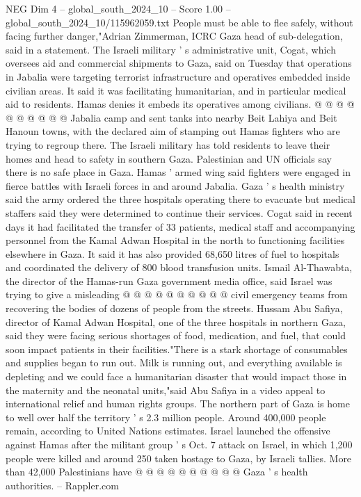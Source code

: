 \begin{textsample}{NEG Dim 4 – global\_south\_2024\_10 – Score 1.00 – global\_south\_2024\_10/115962059.txt}
People must be able to flee safely, without facing further danger,"Adrian Zimmerman, ICRC Gaza head of sub-delegation, said in a statement.
The Israeli military ' s administrative unit, Cogat, which oversees aid and commercial shipments to Gaza, said on Tuesday that operations in Jabalia were targeting terrorist infrastructure and operatives embedded inside civilian areas.
It said it was facilitating humanitarian, and in particular medical aid to residents.
Hamas denies it embeds its operatives among civilians. @ @ @ @ @ @ @ @ @ @ Jabalia camp and sent tanks into nearby Beit Lahiya and Beit Hanoun towns, with the declared aim of stamping out Hamas fighters who are trying to regroup there.
The Israeli military has told residents to leave their homes and head to safety in southern Gaza.
Palestinian and UN officials say there is no safe place in Gaza.
Hamas ' armed wing said fighters were engaged in fierce battles with Israeli forces in and around Jabalia.
Gaza ' s health ministry said the army ordered the three hospitals operating there to evacuate but medical staffers said they were determined to continue their services.
Cogat said in recent days it had facilitated the transfer of 33 patients, medical staff and accompanying personnel from the Kamal Adwan Hospital in the north to functioning facilities elsewhere in Gaza.
It said it has also provided 68,650 litres of fuel to hospitals and coordinated the delivery of 800 blood transfusion units.
Ismail Al-Thawabta, the director of the Hamas-run Gaza government media office, said Israel was trying to give a misleading @ @ @ @ @ @ @ @ @ @ civil emergency teams from recovering the bodies of dozens of people from the streets.
Hussam Abu Safiya, director of Kamal Adwan Hospital, one of the three hospitals in northern Gaza, said they were facing serious shortages of food, medication, and fuel, that could soon impact patients in their facilities."There is a stark shortage of consumables and supplies began to run out.
Milk is running out, and everything available is depleting and we could face a humanitarian disaster that would impact those in the maternity and the neonatal units,"said Abu Safiya in a video appeal to international relief and human rights groups.
The northern part of Gaza is home to well over half the territory ' s 2.3 million people.
Around 400,000 people remain, according to United Nations estimates.
Israel launched the offensive against Hamas after the militant group ' s Oct. 7 attack on Israel, in which 1,200 people were killed and around 250 taken hostage to Gaza, by Israeli tallies.
More than 42,000 Palestinians have @ @ @ @ @ @ @ @ @ @ Gaza ' s health authorities. -- Rappler.com

\end{textsample}
